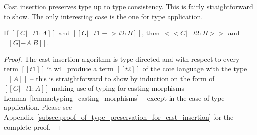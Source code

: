 Cast insertion preserves type up to type consistency.  This is fairly
straightforward to show.  The only interesting case is the one for
type application.
\begin{lemma}
  \label{lemma:type_preservation_for_cast_insertion}
  If $[[G |- t1 : A]]$ and $[[G |- t1 => t2 : B]]$, then $<<G |- t2 : B>>$ and $[[G |- A ~ B]]$.
\end{lemma}
\begin{proof}
  The cast insertion algorithm is type directed and with respect to
  every term $[[t1]]$ it will produce a term $[[t2]]$ of the core
  language with the type $[[A]]$ -- this is straightforward to show by
  induction on the form of $[[G |- t1 : A]]$ making use of typing for
  casting morphisms Lemma~\ref{lemma:typing_casting_morphisms} --
  except in the case of type application.  Please see
  Appendix~\ref{subsec:proof_of_type_preservation_for_cast_insertion}
  for the complete proof.
\end{proof}

